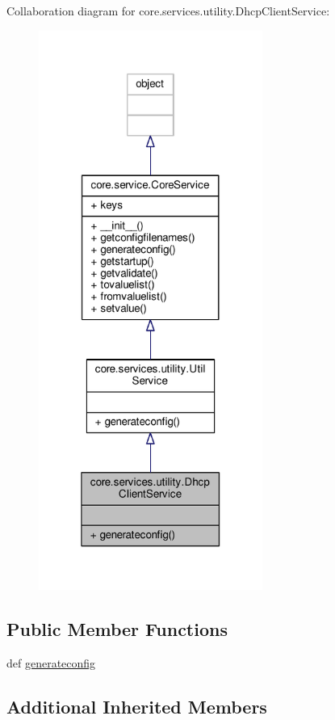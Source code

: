 Collaboration diagram for core.\+services.\+utility.\+Dhcp\+Client\+Service\+:
\nopagebreak
\begin{figure}[H]
\begin{center}
\leavevmode
\includegraphics[width=208pt]{classcore_1_1services_1_1utility_1_1_dhcp_client_service__coll__graph}
\end{center}
\end{figure}
\subsection*{Public Member Functions}
\begin{DoxyCompactItemize}
\item 
def \hyperlink{classcore_1_1services_1_1utility_1_1_dhcp_client_service_aa40456bb397283260bbbf3cf234d7142}{generateconfig}
\end{DoxyCompactItemize}
\subsection*{Additional Inherited Members}



